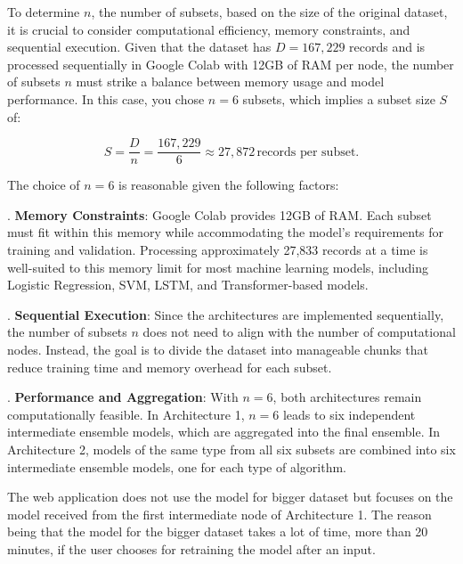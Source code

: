 \vspace{1em}

\noindent
To determine \( n \), the number of subsets, based on the size of the original dataset, it is crucial to consider computational efficiency, memory constraints, and sequential execution. Given that the dataset has \( D = 167,229 \) records and is processed sequentially in Google Colab with 12GB of RAM per node, the number of subsets \( n \) must strike a balance between memory usage and model performance. In this case, you chose \( n = 6 \) subsets, which implies a subset size \( S \) of:

\[
S = \frac{D}{n} = \frac{167,229}{6} \approx 27,872 \, \text{records per subset}.
\]

\vspace{1em}

\noindent
The choice of \( n = 6 \) is reasonable given the following factors:

\vspace{1em}

. \textbf{Memory Constraints}: Google Colab provides 12GB of RAM. Each subset must fit within this memory while accommodating the model's requirements for training and validation. Processing approximately 27,833 records at a time is well-suited to this memory limit for most machine learning models, including Logistic Regression, SVM, LSTM, and Transformer-based models.

. \textbf{Sequential Execution}: Since the architectures are implemented sequentially, the number of subsets \( n \) does not need to align with the number of computational nodes. Instead, the goal is to divide the dataset into manageable chunks that reduce training time and memory overhead for each subset.

. \textbf{Performance and Aggregation}: With \( n = 6 \), both architectures remain computationally feasible. In Architecture 1, \( n = 6 \) leads to six independent intermediate ensemble models, which are aggregated into the final ensemble. In Architecture 2, models of the same type from all six subsets are combined into six intermediate ensemble models, one for each type of algorithm.

\vspace{1em}

\noindent
The web application does not use the model for bigger dataset but focuses on the model received from the first intermediate node of Architecture 1. The reason being that the model for the bigger dataset takes a lot of time, more than 20 minutes, if the user chooses for retraining the model after an input.

\pagebreak

